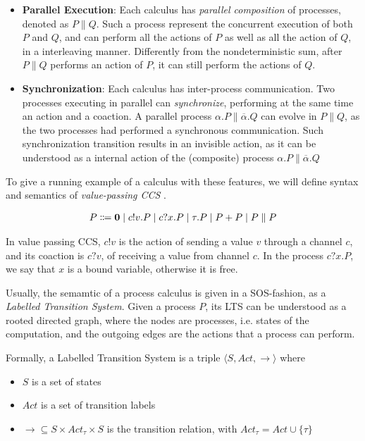\begin{itemize}
\item \textbf{Parallel Execution}: Each calculus has \textit{parallel composition} of processes, denoted as $P \parallel Q$. Such a process represent the concurrent execution of both $P$ and $Q$, and can perform all the actions of $P$ as well as all the action of $Q$, in a interleaving manner. Differently from the nondeterministic sum, after $P\parallel Q$ performs an action of $P$, it can still perform the actions of $Q$.
\item \textbf{Synchronization}: Each calculus has inter-process communication. Two processes executing in parallel can \textit{synchronize}, performing at the same time an action and a coaction. A parallel process $\alpha.P \parallel \overline{\alpha}.Q$ can evolve in $P \parallel Q$, as the two processes had performed a synchronous communication. Such synchronization transition results in an invisible action, as it can be understood as a internal action of the (composite) process $\alpha.P \parallel \overline{\alpha}.Q$ 

\end{itemize}

To give a running example of a calculus with these features, we will define syntax and semantics of \textit{value-passing CCS} \cite{hennessyTheoryCommunicatingProcesses1993}.

\begin{align*}
  P \Coloneqq \mathbf{0} \mid c!v. P \mid c?x.P \mid \tau.P \mid P + P \mid P \parallel P
\end{align*}	

In value passing CCS, $c!v$ is the action of sending a value $v$ through a channel $c$, and its coaction is $c?v$, of receiving a value from channel $c$. In the process $c?x.P$, we say that $x$ is a bound variable, otherwise it is free.

Usually, the semamtic of a process calculus is given in a SOS-fashion, as a \textit{Labelled Transition System}. Given a process $P$, its LTS can be understood as a rooted directed graph, where the nodes are processes, i.e. states of the computation, and the outgoing edges are the actions that a process can perform.

Formally, a Labelled Transition System is a triple $\langle S , Act, \rightarrow \rangle$ where \begin{itemize}
\item $S$ is a set of states
\item $Act$ is a set of transition labels
\item $\rightarrow 	\subseteq S\times Act_\tau \times S$ is the transition relation, with $Act_\tau = Act \cup \{\tau\}$
\end{itemize} 

